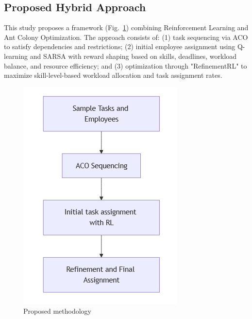 \documentclass[12pt]{article}
\begin{document}
	\subsection{\label{subsec}Proposed Hybrid Approach}
	This study proposes a framework (Fig.~\ref{fig:flow}) combining Reinforcement Learning and Ant Colony Optimization. The approach consists of: (1) task sequencing via ACO to satisfy dependencies and restrictions; (2) initial employee assignment using Q-learning and SARSA with reward shaping based on skills, deadlines, workload balance, and resource efficiency; and (3) optimization through "RefinementRL" to maximize skill-level-based workload allocation and task assignment rates.
	
		\begin{figure}[!hb]
		\centering
		\includegraphics[width=0.3\linewidth]{figures/Initial_flow}
		\caption{\label{fig:flow}Proposed methodology}
	\end{figure}
	
\end{document}

